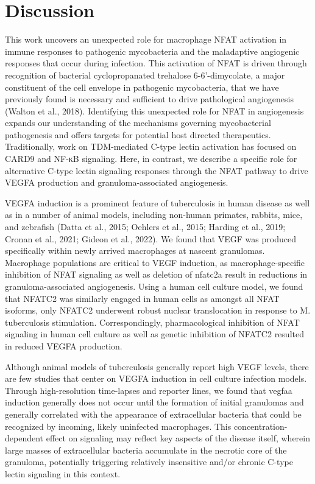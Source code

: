 \section{Discussion}

This work uncovers an unexpected role for macrophage NFAT activation in immune responses to pathogenic mycobacteria and the maladaptive angiogenic responses that occur during infection. This activation of NFAT is driven through recognition of bacterial  cyclopropanated trehalose 6-6’-dimycolate, a major constituent of the cell envelope in pathogenic mycobacteria, that we have previously found is necessary and sufficient to drive pathological angiogenesis (Walton et al., 2018). Identifying this unexpected role for NFAT in angiogenesis expands our understanding of the mechanisms governing mycobacterial pathogenesis and offers targets for potential host directed therapeutics. Traditionally, work on TDM-mediated C-type lectin activation has focused on CARD9 and NF-κB signaling. Here, in contrast, we describe a specific role for alternative C-type lectin signaling responses through the NFAT pathway to drive VEGFA production and granuloma-associated angiogenesis. 

VEGFA induction is a prominent feature of tuberculosis in human disease as well as in a number of animal models, including non-human primates, rabbits, mice, and zebrafish (Datta et al., 2015; Oehlers et al., 2015; Harding et al., 2019; Cronan et al., 2021; Gideon et al., 2022). We found that VEGF was produced specifically within newly arrived macrophages at nascent granulomas. Macrophage populations are critical to VEGF induction, as macrophage-specific inhibition of NFAT signaling as well as deletion of nfatc2a result in reductions in granuloma-associated angiogenesis. Using a human cell culture model, we found that NFATC2 was similarly engaged in human cells as amongst all NFAT isoforms, only NFATC2 underwent robust nuclear translocation in response to M. tuberculosis stimulation. Correspondingly, pharmacological inhibition of NFAT signaling in human cell culture as well as genetic inhibition of NFATC2 resulted in reduced VEGFA production.

Although animal models of tuberculosis generally report high VEGF levels, there are few studies that center on VEGFA induction in cell culture infection models. Through high-resolution time-lapses and reporter lines, we found that vegfaa induction generally does not occur until the formation of initial granulomas and generally correlated with the appearance of extracellular bacteria that could be recognized by incoming, likely uninfected macrophages. This concentration-dependent effect on signaling may reflect key aspects of the disease itself, wherein large masses of extracellular bacteria accumulate in the necrotic core of the granuloma, potentially triggering relatively insensitive and/or chronic C-type lectin signaling in this context.

